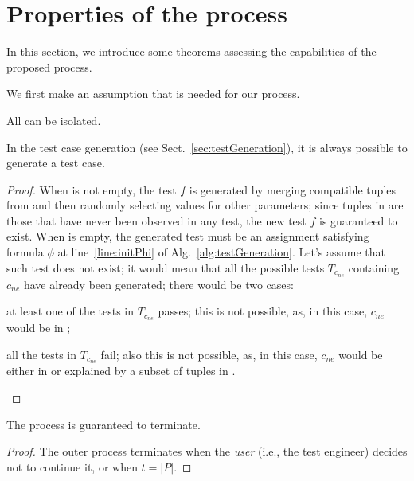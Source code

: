 \begin{tikzborder}{\cite{Gargantini16:validation}}
\begin{tikzborder}{\cite{gargantini_combinatorial_2017}}
\begin{tikzborder}{\cite{garn2019}}
\begin{tikzborder}{\cite{arcaini2019achieving}}
\section{Properties of the \mix process}\label{sec:theorems}

\begin{tikzborder}{}	
In this section, we introduce some theorems assessing the capabilities of the proposed process.

We first make an assumption that is needed for our process.

\begin{assumption}\label{assu:oneTestEts}
	All \truemfics can be isolated.
\end{assumption}

\begin{thm}\label{thm:testGen}
	In the test case generation (see Sect.~\ref{sec:testGeneration}), it is always possible to generate a test case.
\end{thm}

\begin{proof}
	When \ut is not empty, the test $f$ is generated by merging compatible tuples from \ut and then randomly selecting values for other parameters; since tuples in \ut are those that have never been observed in any test, the new test $f$ is guaranteed to exist. When \ut is empty, the generated test must be an assignment satisfying formula $\phi$ at line~\ref{line:initPhi} of Alg.~\ref{alg:testGeneration}. Let's assume that such test does not exist; it would mean that all the possible tests $T_{c_{\mathit{ne}}}$ containing $c_{\mathit{ne}}$ have already been generated; there would be two cases:
	\begin{compactitem}
		\item at least one of the tests in $T_{c_{\mathit{ne}}}$ passes; this is not possible, as, in this case, $c_{\mathit{ne}}$ would be in \pt;
		\item all the tests in $T_{c_{\mathit{ne}}}$ fail; also this is not possible, as, in this case, $c_{\mathit{ne}}$ would be either in \isoMficsSet or explained by a subset of tuples in \isoMficsSet.
	\end{compactitem}
\end{proof}

\begin{thm}[Termination]\label{thm:termination}
	The process is guaranteed to terminate.
\end{thm}

\begin{proof}
	The outer process \mix terminates when the \textit{user} (i.e., the test engineer) decides not to continue it, or when $t=\vert P \vert$.
	

\end{proof}
\end{tikzborder}
\end{tikzborder}
\end{tikzborder}
\end{tikzborder}
\end{tikzborder}
